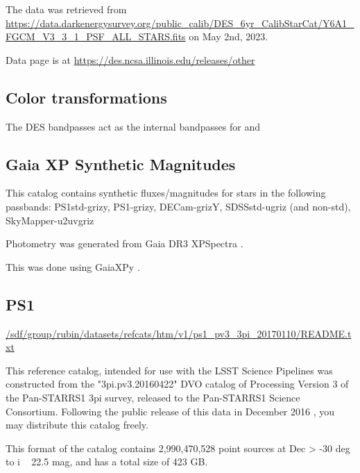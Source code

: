 The data was retrieved from \url{https://data.darkenergysurvey.org/public_calib/DES_6yr_CalibStarCat/Y6A1_FGCM_V3_3_1_PSF_ALL_STARS.fits} on May 2nd, 2023.

Data page is at \url{https://des.ncsa.illinois.edu/releases/other}

\subsection{Color transformations}
The DES bandpasses act as the internal bandpasses for \monster and 

\subsection{Gaia XP Synthetic Magnitudes}
This catalog contains synthetic fluxes/magnitudes for stars in the following passbands:
PS1std-grizy, PS1-grizy, DECam-grizY, SDSSstd-ugriz (and non-std), SkyMapper-u2uvgriz

Photometry was generated from Gaia DR3 XPSpectra \cite{https://arxiv.org/abs/2206.06215}. 

This was done using GaiaXPy \cite{https://github.com/gaia-dpci/GaiaXPy/cd}.

\subsection{PS1}
\url{/sdf/group/rubin/datasets/refcats/htm/v1/ps1_pv3_3pi_20170110/README.txt}

This reference catalog, intended for use with the LSST Science Pipelines \cite{https://pipelines.lsst.io} was constructed from the "3pi.pv3.20160422" DVO catalog of Processing Version 3 of the Pan-STARRS1 3pi survey, released to the Pan-STARRS1 Science Consortium. Following the public release of this data in December 2016 \cite{http://panstarrs.stsci.edu}, you may distribute this catalog freely.

This format of the catalog contains 2,990,470,528 point sources at Dec > -30 deg to i ~ 22.5 mag, and has a total size of 423 GB. 


